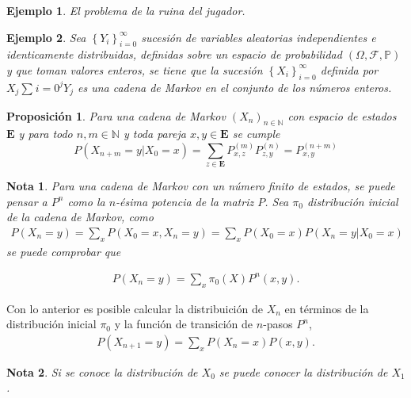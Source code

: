 \documentclass{article}
\newtheorem{Ejem}{Ejemplo}[section]
\newtheorem{Note}{Nota}[section]
\newtheorem{Prop}{Proposición}[section]
\newcommand{\nat}{\mathbb{N}}
\newcommand{\Eb}{\mathbf{E}}
\newcommand{\prob}{\mathbb{P}}
\numberwithin{equation}{section}
\begin{document}
\begin{Ejem}
El problema de la ruina del jugador.
\end{Ejem}

\begin{Ejem}
Sea $\left\{Y_{i}\right\}_{i=0}^{\infty}$ sucesi\'on de variables aleatorias independientes e identicamente distribuidas, definidas sobre un espacio de probabilidad $\left(\Omega,\mathcal{F},\prob\right)$ y que toman valores enteros, se tiene que la sucesi\'on $\left\{X_{i}\right\}_{i=0}^{\infty}$ definida por $X_{j}\sum_{}i=0^{j}Y_{j}$ es una cadena de Markov en el conjunto de los n\'umeros enteros.
\end{Ejem}

\begin{Prop}
Para una cadena de Markov $\left(X_{n}\right)_{n\in\nat}$ con espacio de estados $\Eb$ y para todo $n,m\in \nat$ y toda pareja $x,y\in\Eb$ se cumple
\begin{equation}
P\left(X_{n+m}=y|X_{0}=x\right)=\sum_{z\in\Eb}P_{x,z}^{(m)}P_{z,y}^{(n)}=P_{x,y}^{(n+m)}
\end{equation}
\end{Prop}

\begin{Note}
Para una cadena de Markov con un n\'umero finito de estados, se puede pensar a $P^{n}$ como la $n$-\'esima potencia de la matriz $P$. Sea $\pi_{0}$ distribuci\'on inicial de la cadena de Markov, como 
\begin{eqnarray}
P\left(X_{n}=y\right)=\sum_{x} P\left(X_{0}=x,X_{n}=y\right)=\sum_{x} P\left(X_{0}=x\right)P\left(X_{n}=y|X_{0}=x\right)
\end{eqnarray}
se puede comprobar que 

\begin{eqnarray}
P\left(X_{n}=y\right)=\sum_{x} \pi_{0}\left(X\right)P^{n}\left(x,y\right).
\end{eqnarray}
\end{Note}

Con lo anterior es posible calcular la distribuici\'on de $X_{n}$ en t\'erminos de la distribuci\'on inicial $\pi_{0}$ y la funci\'on de transici\'on de $n$-pasos $P^{n}$,
\begin{eqnarray}
P\left(X_{n+1}=y\right)=\sum_{x} P\left(X_{n}=x\right)P\left(x,y\right).
\end{eqnarray}
\begin{Note}
Si se conoce la distribuci\'on de $X_{0}$ se puede conocer la distribuci\'on de $X_{1}$.
\end{Note}
\end{document}
